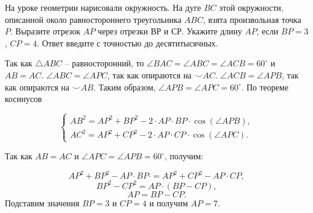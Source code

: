 
На уроке геометрии нарисовали окружность. 
На дуге $BC$ этой окружности, описанной около равностороннего треугольника $ABC$, 
взята произвольная точка $P$. Выразите отрезок $AP$ через отрезки $ВР$ и $СР$. 
Укажите длину $AP$, если $BP = 3$, $CP = 4$. Ответ введите с точностью до десятитысячных.

\soultionSection

Так как $\triangle ABC$ -- равносторонний, то $\angle BAC = \angle ABC = 
\angle ACB = 60^{\circ}$ и \linebreak $AB=AC$. $\angle ABC = \angle APC$, так как опираются на $\smile AC$. $\angle ACB = \angle APB$, так как опираются на $\smile{AB}$. Таким образом, $\angle APB = \angle APC = 60^{\circ}$. По теореме косинусов 

\begin{equation*} 
    \begin{cases}
    AB^2 = AP^2 + BP^2 - 2 \cdot AP\cdot BP\cdot \cos(\angle APB),\\
    AC^2 = AP^2 + CP^2 - 2 \cdot AP\cdot CP\cdot \cos(\angle APC).
    \end{cases}
\end{equation*}


Так как $AB = AC$ и $\angle APC = \angle APB = 60^{\circ}$, получим:

$$AP^2 + BP^2 - AP\cdot BP\cdot = AP^2 + CP^2 - AP\cdot CP,$$
$$BP^2 - CP^2 = AP\cdot (BP - CP),$$
$$AP = BP - CP.$$
Подставим значения $BP = 3$ и $CP = 4$ и получим $AP = 7$.

